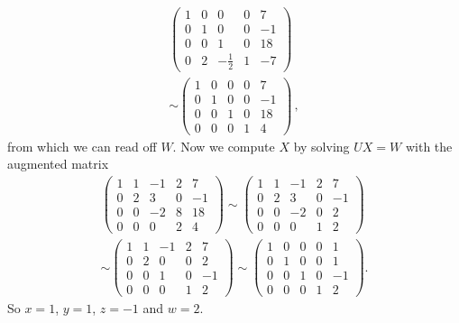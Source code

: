 \begin{enumerate}
\begin{gather*}
\left(
\begin{array}{cccc|c}
1&0&0&0&7\\
0&1&0&0&-1\\
0&0&1&0&18\\
0&2&-\frac12&1&-7
\end{array}\right)\\\sim 
\left(
\begin{array}{cccc|c}
1&0&0&0&7\\
0&1&0&0&-1\\
0&0&1&0&18\\
0&0&0&1&4
\end{array}\right)\, ,
\end{gather*}
from which we can read off $W$.
Now we compute $X$ by solving $UX=W$ with the augmented matrix
\begin{gather*}
\left(
\begin{array}{cccc|c}
1&1&-1&2&7\\
0&2&3&0&-1\\
0&0&-2&8&18\\
0&0&0&2&4
\end{array}\right)
\sim
\left(
\begin{array}{cccc|c}
1&1&-1&2&7\\
0&2&3&0&-1\\
0&0&-2&0&2\\
0&0&0&1&2
\end{array}\right)
\\
\sim
\left(
\begin{array}{cccc|c}
1&1&-1&2&7\\
0&2&0&0&2\\
0&0&1&0&-1\\
0&0&0&1&2
\end{array}\right)
\sim
\left(
\begin{array}{cccc|c}
1&0&0&0&1\\
0&1&0&0&1\\
0&0&1&0&-1\\
0&0&0&1&2
\end{array}\right).
\end{gather*}
So $x=1$, $y=1$, $z=-1$ and $w=2$.

\end{enumerate}

\newpage
